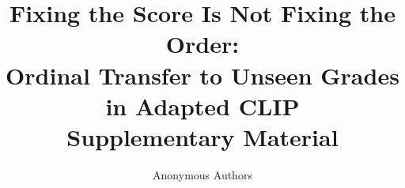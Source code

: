 \documentclass[10pt,twocolumn,letterpaper]{article}
\title{Fixing the Score Is Not Fixing the Order:\\
Ordinal Transfer to Unseen Grades in Adapted CLIP\\[0.3em]
{\large Supplementary Material}}
\author{Anonymous Authors}
\begin{document}
\maketitle
\appendix
\renewcommand{\thefigure}{S\arabic{figure}}
\renewcommand{\thetable}{S\arabic{table}}
\renewcommand{\theequation}{S\arabic{equation}}








\end{document}
